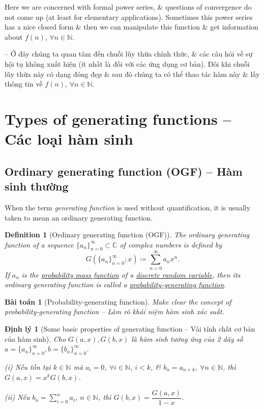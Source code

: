 \documentclass[oneside]{book}
\newtheorem{baitoan}{Bài toán}
\newtheorem{definition}{Definition}
\newtheorem{dinhly}{Định lý}
\begin{document}
Here we are concerned with formal power series, \& questions of convergence do not come up (at least for elementary applications). Sometimes this power series has a nice closed form \& then we can manipulate this function \& get information about $f(n)$, $\forall n\in\mathbb{N}$.

-- Ở đây chúng ta quan tâm đến chuỗi lũy thừa chính thức, \& các câu hỏi về sự hội tụ không xuất hiện (ít nhất là đối với các ứng dụng cơ bản). Đôi khi chuỗi lũy thừa này có dạng đóng đẹp \& sau đó chúng ta có thể thao tác hàm này \& lấy thông tin về $f(n)$, $\forall n\in\mathbb{N}$.


\section{Types of generating functions -- Các loại hàm sinh}

\subsection{Ordinary generating function (OGF) -- Hàm sinh thường}
When the term {\it generating function} is used without quantification, it is usually taken to mean an ordinary generating function.

\begin{definition}[Ordinary generating function (OGF)]
	The {\rm ordinary generating function} of a sequence $\{a_n\}_{n=0}^\infty\subset\mathbb{C}$ of complex numbers is defined by
	\begin{equation*}
		G(\{a_n\}_{n=0}^\infty;x)\coloneqq\sum_{n=0}^\infty a_nx^n.
	\end{equation*}
	If $a_n$ is the \href{https://en.wikipedia.org/wiki/Probability_mass_function}{probability mass function} of a \href{https://en.wikipedia.org/wiki/Discrete_random_variable}{discrete random variable}, then its ordinary generating function is called a \href{https://en.wikipedia.org/wiki/Probability-generating_function}{probability-generating function}.
\end{definition}

\begin{baitoan}[Probability-generating function]
	Make clear the concept of probability-generating function -- Làm rõ khái niệm hàm sinh xác suất.
\end{baitoan}

\begin{dinhly}[Some basic properties of generating function -- Vài tính chất cơ bản của hàm sinh]
	Cho $G(a,x),G(b,x)$ là hàm sinh tương ứng của 2 dãy số $a= \{a_n\}_{n=0}^\infty,b = \{b_n\}_{n=0}^\infty$.
	\item(i) Nếu tồn tại $k\in\mathbb{N}$ mà $a_i = 0$, $\forall i\in\mathbb{N}$, $i < k$, \& $b_n = a_{n+k}$, $\forall n\in\mathbb{N}$, thì $G(a,x) = x^kG(b,x)$.
	\item(ii) Nếu $b_n = \sum_{i=0}^n a_i$, $n\in\mathbb{N}$, thì $G(b,x) = \dfrac{G(a,x)}{1 - x}$.
\end{dinhly}
\end{document}
